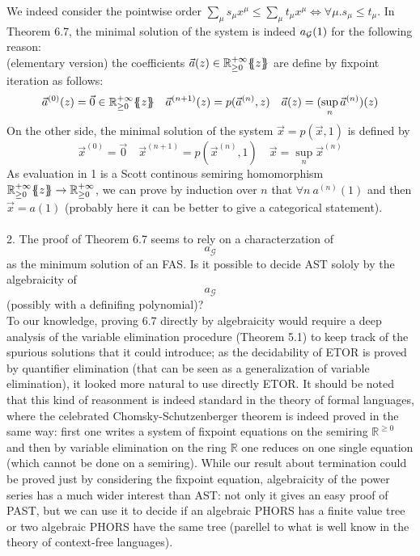 \documentclass[11pt]{article}
\begin{document}
We indeed consider the pointwise order $ \sum_\mu s_{\mu} x^\mu \le \sum_\mu t_\mu x^\mu \Leftrightarrow \forall \mu. s_\mu \le t_\mu $. In Theorem 6.7, the minimal solution of the system is indeed $a_{\mathcal{G}}(1)$ for the following reason:\\
(elementary version) the coefficients $\vec a(z) \in {\mathbb{R}^{+\infty}_{\geq 0}}\{\!\!\{z\}\!\!\}$ are define by fixpoint iteration as follows:
$$ \vec a^{(0)}(z) = \vec 0 \in {\mathbb{R}^{+\infty}_{\geq 0}}\{\!\!\{z\}\!\!\} \quad \vec a^{(n+1)}(z) = p(\vec a^{(n)}, z) \quad \vec{a}(z)= (\sup_n \vec{a}^{(n)})(z)$$
On the other side, the minimal solution of the system $\vec x = p(\vec x , 1)$ is defined by
$$ \vec x^{(0)} = \vec 0  \quad \vec x^{(n+1)} = p(\vec x^{(n)}, 1) \quad \vec x = \sup_n \vec{x}^{(n)}$$
As evaluation in 1 is a Scott continous semiring homomorphism ${\mathbb{R}^{+\infty}_{\geq 0}}\{\!\!\{z\}\!\!\} \to \mathbb{R}^{+\infty}_{\geq 0}$, we can prove by induction over $n$ that $\forall n \: a^{(n)}(1)$ and then $\vec{x} = a(1)$
(probably here it can be better to give a categorical statement).\\
\\2. The proof of Theorem 6.7 seems to rely on a characterzation of $$ a_{\mathcal{G}} $$ as the minimum solution of an FAS. Is it possible to decide AST sololy by the algebraicity of $$ a_{\mathcal{G}} $$ (possibly with a definifing polynomial)?\\
To our knowledge, proving 6.7 directly by algebraicity would require a deep analysis of the variable elimination procedure (Theorem 5.1) to keep track of the spurious solutions that it could introduce; as the decidability of ETOR is proved by quantifier elimination (that can be seen as a generalization of variable elimination), it looked more natural to use directly ETOR. 
It should be noted that this kind of reasonment is indeed standard in the theory of formal languages, where the celebrated Chomsky-Schutzenberger theorem is indeed proved in the same way: first one writes a system of fixpoint equations on the semiring $\mathbb{R}^{\geq 0}$ and then by variable elimination on the ring $\mathbb{R}$ one reduces on one single equation (which cannot be done on a semiring). 
While our result about termination could be proved just by considering the fixpoint equation, algebraicity of the power series has a much wider interest than AST: not only it gives an easy proof of PAST, but we can use it to decide if an algebraic PHORS has a finite value tree or two algebraic PHORS have the same tree (parellel to what is well know in the theory of context-free languages).
	
	
	
\end{document}
